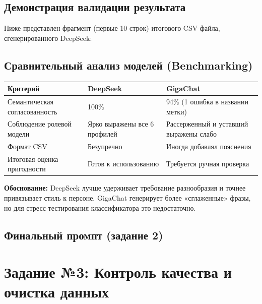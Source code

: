 \documentclass[oneside,a4paper,14pt]{extarticle} %
\begin{document}
	\subsection{Демонстрация валидации результата}
	\noindent
	Ниже представлен фрагмент (первые 10 строк) итогового CSV-файла, сгенерированного DeepSeek:
	
	\subsection{Сравнительный анализ моделей (Benchmarking)}
	\noindent
	\begin{table}[H]
		\centering
		\begin{tabular}{|p{6cm}|p{5cm}|p{5cm}|}
			\hline
			\textbf{Критерий} & \textbf{DeepSeek} & \textbf{GigaChat} \\ \hline
			Семантическая согласованность & 100\% & 94\% (1 ошибка в названии метки) \\ \hline
			Соблюдение ролевой модели & Ярко выражены все 6 профилей & Рассерженный и уставший выражены слабо \\ \hline
			Формат CSV & Безупречно & Иногда добавлял пояснения \\ \hline
			Итоговая оценка пригодности & Готов к использованию & Требуется ручная проверка \\ \hline
		\end{tabular}
	\end{table}
	\noindent
	\textbf{Обоснование:} DeepSeek лучше удерживает требование разнообразия и точнее привязывает стиль к персоне. GigaChat генерирует более «сглаженные» фразы, но для стресс-тестирования классификатора это недостаточно.
	\subsection{Финальный промпт (задание 2)}
	
	\newpage
	\section{Задание №3: Контроль качества и очистка данных}
\end{document}
